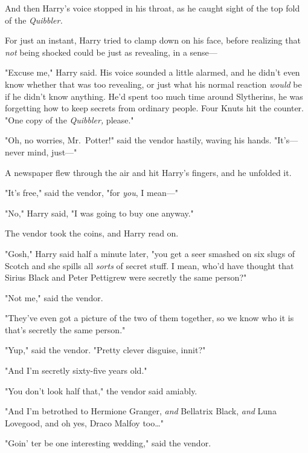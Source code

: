 And then Harry's voice stopped in his throat, as he caught sight of the top
fold of the \emph{Quibbler.}


For just an instant, Harry tried to clamp down on his face, before realizing
that \emph{not} being shocked could be just as revealing, in a sense---

"Excuse me," Harry said. His voice sounded a little alarmed, and he didn't even
know whether that was too revealing, or just what his normal reaction
\emph{would} be if he didn't know anything. He'd spent too much time around
Slytherins, he was forgetting how to keep secrets from ordinary people. Four
Knuts hit the counter. "One copy of the \emph{Quibbler,} please."

"Oh, no worries, Mr.~Potter!" said the vendor hastily, waving his hands.
"It's---never mind, just---"

A newspaper flew through the air and hit Harry's fingers, and he unfolded it.


"It's free," said the vendor, "for \emph{you}, I mean---"

"No," Harry said, "I was going to buy one anyway."

The vendor took the coins, and Harry read on.

"Gosh," Harry said half a minute later, "you get a seer smashed on six slugs of
Scotch and she spills all \emph{sorts} of secret stuff. I mean, who'd have
thought that Sirius Black and Peter Pettigrew were secretly the same person?"

"Not me," said the vendor.

"They've even got a picture of the two of them together, so we know who it is
that's secretly the same person."

"Yup," said the vendor. "Pretty clever disguise, innit?"

"And I'm secretly sixty-five years old."

"You don't look half that," the vendor said amiably.

"And I'm betrothed to Hermione Granger, \emph{and} Bellatrix Black, \emph{and}
Luna Lovegood, and oh yes, Draco Malfoy too{\ldots}"

"Goin' ter be one interesting wedding," said the vendor.

